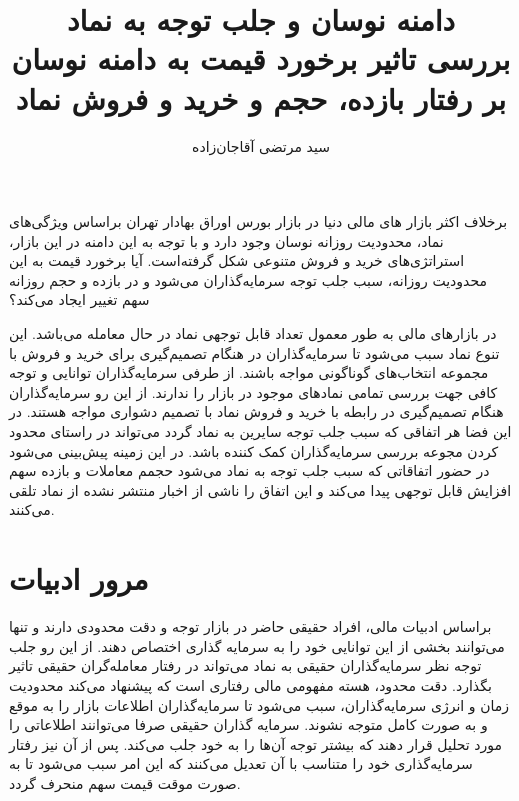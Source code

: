 \documentclass[12pt]{article}
\begin{document}
\nopagebreak
\title{
 دامنه نوسان و جلب توجه به نماد \\
  \large 
  بررسی  تاثیر برخورد قیمت به دامنه نوسان بر رفتار بازده، حجم و خرید و فروش نماد }
\author{سید مرتضی آقاجان‌زاده}
\nopagebreak
{\maketitle}

برخلاف اکثر بازار های مالی دنیا در بازار بورس اوراق بهادار تهران براساس ویژگی‌های نماد، محدودیت‌ روزانه نوسان  وجود دارد و با توجه به این دامنه در این بازار، استراتژی‌های خرید و فروش متنوعی شکل گرفته‌است. 
آیا برخورد قیمت به این محدودیت روزانه، سبب جلب توجه سرمایه‌گذاران می‌شود و در بازده و حجم روزانه سهم تغییر ایجاد می‌کند؟ 


در بازار‌های مالی به طور معمول تعداد قابل توجهی نماد در حال معامله می‌باشد. این تنوع نماد سبب می‌شود تا سرمایه‌گذاران در هنگام تصمیم‌گیری برای خرید و فروش با مجموعه انتخاب‌های گوناگونی مواجه باشند. از طرفی سرمایه‌گذاران توانایی و توجه کافی جهت بررسی تمامی نماد‌های موجود در بازار را ندارند.
از این رو سرمایه‌گذاران هنگام تصمیم‌گیری در رابطه با خرید و فروش نماد با تصمیم دشواری مواجه هستند. 
در این فضا هر اتفاقی که سبب جلب توجه سایرین به نماد گردد می‌تواند در راستای محدود کردن مجوعه بررسی سرمایه‌گذاران کمک کننده باشد.
در این زمینه پیش‌بینی می‌شود در حضور اتفاقاتی که سبب جلب توجه به نماد می‌شود حجمم معاملات و بازده سهم افزایش قابل توجهی پیدا می‌کند و این اتفاق را ناشی از اخبار منتشر نشده از نماد تلقی می‌کنند.
 


\section{مرور ادبیات}
\label{s1.1}

براساس ادبیات مالی، افراد حقیقی حاضر در بازار توجه و دقت محدودی دارند و تنها می‌توانند بخشی از این توانایی خود را به سرمایه گذاری اختصاص دهند. از این رو جلب توجه نظر سرمایه‌گذاران حقیقی به نماد می‌تواند در رفتار معامله‌گران حقیقی تاثیر بگذارد. 
\cite{r1}
دقت محدود، هسته مفهومی مالی رفتاری 
است که  پیشنهاد می‌کند محدودیت‌ زمان و انرژی سرمایه‌گذاران، سبب می‌شود تا سرمایه‌گذاران اطلاعات بازار را به موقع و به صورت کامل متوجه نشوند. سرمایه گذاران حقیقی صرفا می‌توانند اطلاعاتی را مورد تحلیل قرار دهند که بیشتر توجه آن‌ها را به خود جلب می‌کند. پس از آن نیز رفتار سرمایه‌گذاری خود را متناسب با آن تعدیل می‌کنند که این امر سبب می‌شود تا به صورت موقت قیمت سهم منحرف گردد.
\cite{r6}
\end{document}
